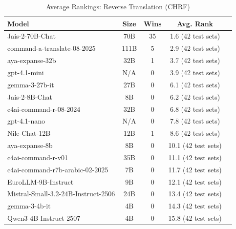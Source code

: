 \begin{table}[htbp]
\centering
\caption{Average Rankings: Reverse Translation (CHRF)}
\label{tab:avg_rankings_chrf}
\begin{tabular}{l@{\hspace{3pt}}c@{\hspace{3pt}}c@{\hspace{3pt}}c@{\hspace{3pt}}c}
\toprule
Model & Size & Wins & Avg. Rank \\
\midrule
Jais-2-70B-Chat & 70B & 35 & 1.6 (42 test sets) \\
command-a-translate-08-2025 & 111B & 5 & 2.9 (42 test sets) \\
aya-expanse-32b & 32B & 1 & 3.7 (42 test sets) \\
gpt-4.1-mini & N/A & 0 & 3.9 (42 test sets) \\
gemma-3-27b-it & 27B & 0 & 6.1 (42 test sets) \\
Jais-2-8B-Chat & 8B & 0 & 6.2 (42 test sets) \\
c4ai-command-r-08-2024 & 32B & 0 & 6.8 (42 test sets) \\
gpt-4.1-nano & N/A & 0 & 7.8 (42 test sets) \\
Nile-Chat-12B & 12B & 1 & 8.6 (42 test sets) \\
aya-expanse-8b & 8B & 0 & 10.1 (42 test sets) \\
c4ai-command-r-v01 & 35B & 0 & 11.1 (42 test sets) \\
c4ai-command-r7b-arabic-02-2025 & 7B & 0 & 11.7 (42 test sets) \\
EuroLLM-9B-Instruct & 9B & 0 & 12.1 (42 test sets) \\
Mistral-Small-3.2-24B-Instruct-2506 & 24B & 0 & 13.4 (42 test sets) \\
gemma-3-4b-it & 4B & 0 & 14.3 (42 test sets) \\
Qwen3-4B-Instruct-2507 & 4B & 0 & 15.8 (42 test sets) \\
\bottomrule
\end{tabular}
\end{table}